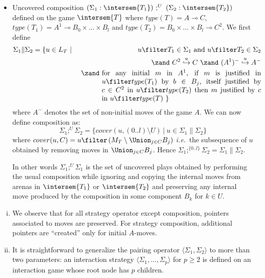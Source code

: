 \begin{definition}
\begin{itemize}[-]
\item Uncovered composition $(\Sigma_1 : \intersem{T_1})\ ;^U\ (\Sigma_2
:\intersem{T_2})$ defined on the game $\intersem{T}$ where
$type(T) = A \multimap C$, $type(T_1) = A^1 \multimap B_0 \times
\ldots \times B_l$ and $type(T_2) = B_0 \times \ldots \times B_l
\multimap C^2$. We first define
\begin{eqnarray*}
\Sigma_1 \| \Sigma_2 &= \{ u \in L_T  \ | \ & u \filter T_1 \in \Sigma_1 \mbox{ and } u \filter T_2 \in \Sigma_2 \\
&& \zand\ C^2\stackrel{u}\hookrightarrow C\ \zand\ (A^1)^-\stackrel{u}\hookrightarrow A^-  \\
&& \zand\ \parbox[t]{8cm}{for any initial $m$ in $A^1$, if $m$ is justified in $u \filter type(T_1)$ by $b\in B_j$,
itself justified by $c \in C^2$ in $u \filter type(T_2)$ then $m$ justified by $c$ in $u \filter type(T)$ \} }
\end{eqnarray*}
where $A^-$ denotes the set of non-initial moves of the game $A$. We can now define composition as:
$$ \Sigma_1 ;^U \Sigma_2 = \{ cover(u,(0..l)\setminus U) \ | \ u \in \Sigma_1 \| \Sigma_2 \}$$
where $cover(u,C) = u \filter \left( M_T \setminus \Union_{j\in
C} B_j \right)$ {\it i.e.}~the subsequence of $u$ obtained by
removing moves in $\Union_{j\in C} B_j$. Hence
$\Sigma_1;^{\{0..l\}} \Sigma_2 = \Sigma_1 \| \Sigma_2$.

In other words $\Sigma_1 ;^U \Sigma_1$ is the set of uncovered
plays obtained by performing the usual composition while
ignoring and copying the internal moves from arenas in
$\intersem{T_1}$ or $\intersem{T_2}$ and preserving any internal
move produced by the composition in some component $B_k$ for $k
\in U$.
\end{itemize}
\end{definition}

\begin{remark} \hfill
\label{rem:interstrat}
\begin{enumerate}[i.]
\item We observe that for all strategy operator
except composition, pointers associated to moves are preserved.
For strategy composition, additional pointers are
``created'' only for initial $A$-moves.
\item It is straightforward to generalize the pairing operator $\langle \Sigma_1, \Sigma_2 \rangle$ to more than two parameters: an interaction strategy $\langle \Sigma_1, \ldots, \Sigma_p \rangle$ for $p\geq2$
is defined on an interaction game whose root node has $p$ children.
\end{enumerate}
\end{remark}

